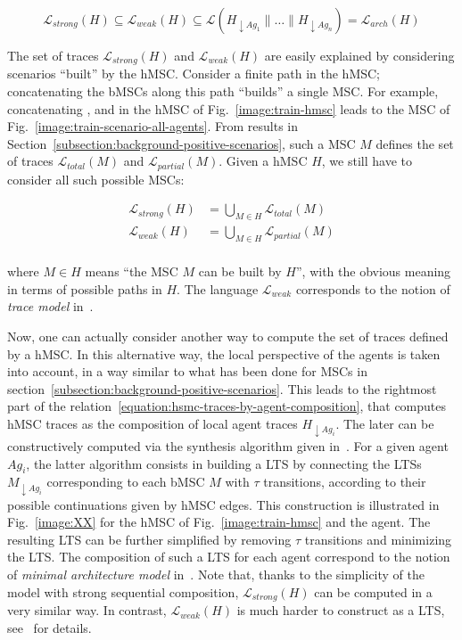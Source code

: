\begin{equation}
\mathcal{L}_{strong}(H) \subseteq \mathcal{L}_{weak}(H) \subseteq \mathcal{L}(H_{\downarrow Ag_1} \parallel \ldots \parallel H_{\downarrow Ag_n}) = \mathcal{L}_{arch}(H)
\label{equation:hsmc-traces-by-agent-composition}
\end{equation}

The set of traces $\mathcal{L}_{strong}(H)$ and $\mathcal{L}_{weak}(H)$ are easily explained by considering scenarios ``built'' by the hMSC. Consider a finite path in the hMSC; concatenating the bMSCs along this path ``builds'' a single MSC. For example, concatenating ,  and  in the hMSC of Fig.~\ref{image:train-hmsc} leads to the MSC of Fig.~\ref{image:train-scenario-all-agents}. From results in Section~\ref{subsection:background-positive-scenarios}, such a MSC $M$ defines the set of traces $\mathcal{L}_{total}(M)$ and $\mathcal{L}_{partial}(M)$. Given a hMSC $H$, we still have to consider all such possible MSCs: 

\vspace{-0.5cm}
\begin{align*}
\mathcal{L}_{strong}(H) &= \bigcup_{M \in H} \mathcal{L}_{total}(M) \\
\mathcal{L}_{weak}(H) &= \bigcup_{M \in H} \mathcal{L}_{partial}(M) \\
\end{align*}

\vspace{-0.8cm}
\noindent where $M \in H$ means ``the MSC $M$ can be built by $H$'', with the obvious meaning in terms of possible paths in $H$. The language $\mathcal{L}_{weak}$ corresponds to the notion of \emph{trace model} in~\cite{Uchitel:2004}.

Now, one can actually consider another way to compute the set of traces defined by a hMSC. In this alternative way, the local perspective of the agents is taken into account, in a way similar to what has been done for MSCs in section~\ref{subsection:background-positive-scenarios}. This leads to the rightmost part of the relation~\ref{equation:hsmc-traces-by-agent-composition}, that computes hMSC traces as the composition of local agent traces $H_{\downarrow Ag_i}$. The later can be constructively computed via the synthesis algorithm given in~\cite{Uchitel:2004}. For a given agent $Ag_{i}$, the latter algorithm consists in building a LTS by connecting the LTSs $M_{\downarrow Ag_i}$ corresponding to each bMSC $M$ with $\tau$ transitions, according to their possible continuations given by hMSC edges. This construction is illustrated in Fig.~\ref{image:XX} for the hMSC of Fig.~\ref{image:train-hmsc} and the  agent. The resulting LTS can be further simplified by removing $\tau$ transitions and minimizing the LTS. The composition of such a LTS for each agent correspond to the notion of \emph{minimal architecture model} in~\cite{Uchitel:2004}. Note that, thanks to the simplicity of the model with strong sequential composition, $\mathcal{L}_{strong}(H)$ can be computed in a very similar way. In contrast, $\mathcal{L}_{weak}(H)$ is much harder to construct as a LTS, see~\cite{Uchitel:2004} for details.

